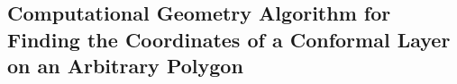 \documentclass{article}
\begin{document}
\subsection{Computational Geometry Algorithm for Finding the Coordinates of a Conformal Layer on an Arbitrary Polygon}
%
%
%
%
%
%
\end{document}
